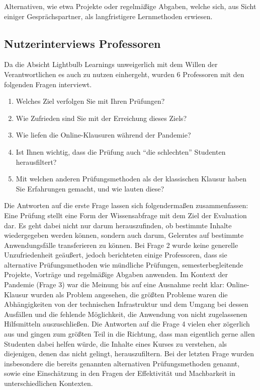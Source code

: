 Alternativen, wie etwa Projekte oder regelmäßige Abgaben, welche sich, aus Sicht einiger Gesprächspartner, als langfristigere Lernmethoden erwiesen.

\subsection{Nutzerinterviews Professoren}
Da die Absicht Lightbulb Learnings unweigerlich mit dem Willen der Verantwortlichen es auch zu nutzen einhergeht, wurden 6 Professoren mit den folgenden Fragen interviewt.

\begin{enumerate}
    \item Welches Ziel verfolgen Sie mit Ihren Prüfungen?
    \item Wie Zufrieden sind Sie mit der Erreichung dieses Ziels?
    \item Wie liefen die Online-Klausuren während der Pandemie?
    \item Ist Ihnen wichtig, dass die Prüfung auch “die schlechten” Studenten herausfiltert?
    \item Mit welchen anderen Prüfungsmethoden als der klassischen Klausur haben Sie Erfahrungen gemacht, und wie lauten diese?
\end{enumerate}

\noindent Die Antworten auf die erste Frage lassen sich folgendermaßen zusammenfassen: Eine Prüfung stellt eine Form der Wissensabfrage mit dem Ziel der Evaluation dar. Es geht dabei nicht nur darum herauszufinden, ob bestimmte Inhalte wiedergegeben werden können, sondern auch darum, Gelerntes auf bestimmte Anwendungsfälle transferieren zu können. Bei Frage 2 wurde keine generelle Unzufriedenheit geäußert, jedoch berichteten einige Professoren, dass sie alternative Prüfungsmethoden wie mündliche Prüfungen, semesterbegleitende Projekte, Vorträge und regelmäßige Abgaben anwenden. Im Kontext der Pandemie (Frage 3) war die Meinung bis auf eine Ausnahme recht klar: Online-Klausur wurden als Problem angesehen, die größten Probleme waren die Abhängigkeiten von der technischen Infrastruktur und dem Umgang bei dessen Ausfällen und die fehlende Möglichkeit, die Anwendung von nicht zugelassenen Hilfsmitteln auszuschließen. Die Antworten auf die Frage 4 vielen eher zögerlich aus und gingen zum größten Teil in die Richtung, dass man eigentlich gerne allen Studenten dabei helfen würde, die Inhalte eines Kurses zu verstehen, als diejenigen, denen das nicht gelingt, herauszufiltern. Bei der letzten Frage wurden insbesondere die bereits genannten alternativen Prüfungsmethoden genannt, sowie eine Einschätzung in den Fragen der Effektivität und Machbarkeit in unterschiedlichen Kontexten.

